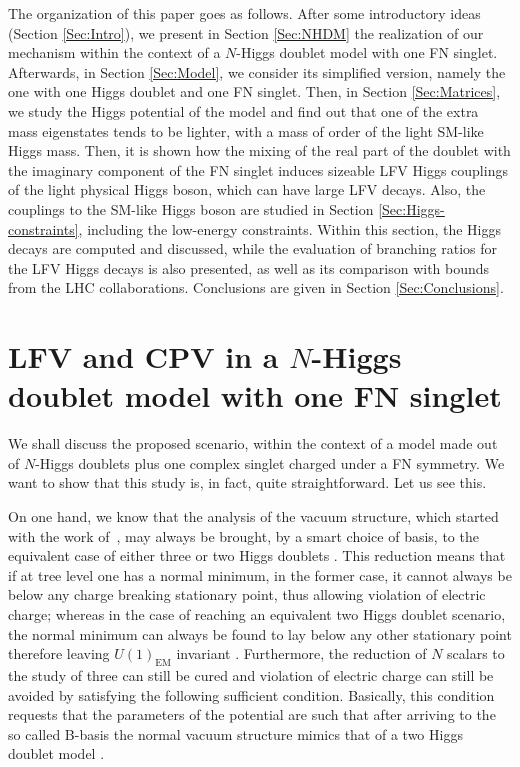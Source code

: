 \documentclass[aps,prd,groupaddress,floatfix,tighten,nofootinbib,showpacs,
amsfonts,superscriptaddress]{revtex4}
\begin{document}
The organization of this paper goes as follows. After some introductory ideas (Section \ref{Sec:Intro}), we present 
in Section \ref{Sec:NHDM} the realization of
our mechanism within the context of a $N$-Higgs doublet model with one FN singlet. Afterwards, in Section \ref{Sec:Model}, 
we consider its simplified version, namely the one with one Higgs {doublet} and one FN singlet. Then, 
in Section \ref{Sec:Matrices}, we study the Higgs potential of the model and find out that one of the extra mass eigenstates 
tends to be lighter, with a mass of order of the light SM-like Higgs mass.
Then, it is shown how the mixing of the real part 
of the doublet with the imaginary component of the FN singlet induces sizeable  LFV Higgs couplings of the light physical
Higgs boson, which can have large LFV decays. 
Also, the couplings to the SM-like Higgs boson are studied in Section \ref{Sec:Higgs-constraints}, including
the low-energy constraints.  Within this section, 
the Higgs decays are computed and discussed, while
the evaluation of branching ratios for the LFV Higgs decays is also presented, as well as its comparison with bounds 
from the LHC collaborations.  Conclusions are given in Section \ref{Sec:Conclusions}.


\section{LFV and CPV in a $N$-Higgs doublet model with one FN singlet\label{Sec:NHDM}}
We shall discuss the proposed scenario, within the context of a
model made out of $N$-Higgs doublets plus one complex singlet charged under a FN symmetry. We want to show that this study is, in fact, quite straightforward. Let us see this.

On one hand, we know that the analysis of the vacuum structure, which started with the work of~\cite{DiazCruz:1992uw}, may always be brought, by a smart choice of basis, to the equivalent case of either three or two Higgs doublets \cite{Barroso:2006pa}. This reduction means that if at tree level one has a normal minimum, in the former case, it cannot always be below any charge breaking stationary point, thus allowing violation of electric charge; whereas in the case of reaching an equivalent two Higgs doublet scenario, the normal minimum can always be found to lay below any other stationary point therefore leaving $U(1)_{\text{EM}}$ invariant \cite{Barroso:2005sm,Ferreira:2004yd}. Furthermore, the reduction of $N$ scalars to the study of three can still be cured and violation of electric charge can still be avoided by satisfying the following sufficient condition. Basically, this condition requests that the parameters of the potential are such that after arriving to the so called B-basis the normal vacuum structure mimics that of a two Higgs doublet model \cite{Barroso:2005sm}. 
\end{document}

